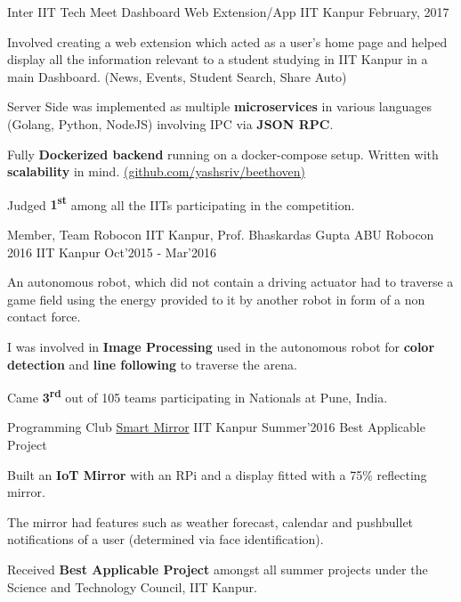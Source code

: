 
\begin{cventries}

  \cventry
  {Inter IIT Tech Meet}
  {Dashboard Web Extension/App}
  {IIT Kanpur}
  {February, 2017}
  {
    \begin{cvitems}
    \item Involved creating a web extension which acted as a user’s home page
      and helped display all the information relevant to a student studying in
      IIT Kanpur in a main Dashboard. (News, Events, Student Search, Share Auto)
    \item Server Side was implemented as multiple \textbf{microservices} in
      various languages (Golang, Python, NodeJS) involving IPC via \textbf{JSON
        RPC}.
    \item Fully \textbf{Dockerized backend} running on a docker-compose setup.
      Written with \textbf{scalability} in mind.
      \href{https://github.com/yashsriv/beethoven}{(github.com/yashsriv/beethoven)}
    \item Judged \textbf{1\textsuperscript{st}} among all the IITs participating
      in the competition.
    \end{cvitems}
  }

  \cventry
  {Member, Team Robocon IIT Kanpur, Prof. Bhaskardas Gupta}
  {ABU Robocon 2016}
  {IIT Kanpur}
  {Oct'2015 - Mar'2016}
  {
    \begin{cvitems}
      \item An autonomous robot, which did not contain a driving actuator had to
        traverse a game field using the energy provided to it by another robot in
        form of a non contact force.
      \item I was involved in \textbf{Image Processing} used in the autonomous
        robot for \textbf{color detection} and \textbf{line following} to
        traverse the arena.
      \item Came \textbf{3\textsuperscript{rd}} out of 105 teams participating in Nationals at Pune, India.
    \end{cvitems}
  }

  \smallcventry
  {Programming Club}
  {\href{http://pclub.in/project/2016/07/06/smartmirror.html}{Smart Mirror}}
  {IIT Kanpur}
  {Summer'2016}
  {Best Applicable Project}
  {
    \begin{cvitems}
    \item Built an \textbf{IoT Mirror} with an RPi and a display fitted with a 75\%
      reflecting mirror.
    \item The mirror had features such as weather forecast, calendar
      and pushbullet notifications of a user (determined via face
      identification).
    \item Received \textbf{Best Applicable Project} amongst all summer projects under
      the Science and Technology Council, IIT Kanpur.
    \end{cvitems}
  }


\end{cventries}
